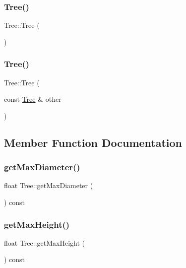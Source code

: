\subsubsection{\texorpdfstring{Tree()}{Tree()}\hspace{0.1cm}{\footnotesize\ttfamily [1/2]}}
{\footnotesize\ttfamily Tree\+::\+Tree (\begin{DoxyParamCaption}{ }\end{DoxyParamCaption})}

\mbox{\label{class_tree_af785767b64df102fdfe700b745d8bb46}} 
\subsubsection{\texorpdfstring{Tree()}{Tree()}\hspace{0.1cm}{\footnotesize\ttfamily [2/2]}}
{\footnotesize\ttfamily Tree\+::\+Tree (\begin{DoxyParamCaption}\item[{const \mbox{\hyperlink{class_tree}{Tree}} \&}]{other }\end{DoxyParamCaption})}



\subsection{Member Function Documentation}
\mbox{\label{class_tree_a38cd2e7ee4d3a5a0f98a65131fc8c444}} 
\subsubsection{\texorpdfstring{get\+Max\+Diameter()}{getMaxDiameter()}}
{\footnotesize\ttfamily float Tree\+::get\+Max\+Diameter (\begin{DoxyParamCaption}{ }\end{DoxyParamCaption}) const}

\mbox{\label{class_tree_a9d8cea49effa2ceb8f4096992ae20fd9}} 
\subsubsection{\texorpdfstring{get\+Max\+Height()}{getMaxHeight()}}
{\footnotesize\ttfamily float Tree\+::get\+Max\+Height (\begin{DoxyParamCaption}{ }\end{DoxyParamCaption}) const}

